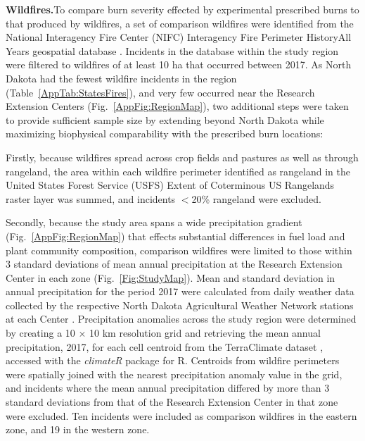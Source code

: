 \documentclass[fire,article,submit,oneauthor,pdftex]{Definitions/mdpi}
\begin{document}
\textbf{Wildfires.\textemdash}To compare burn severity effected by experimental prescribed burns to that produced by wildfires, a set of comparison wildfires were identified from the National Interagency Fire Center (NIFC) Interagency Fire Perimeter History\textemdash All Years geospatial database \cite{nifc2024}. 
Incidents in the database within the study region were filtered to wildfires of at least 10 ha that occurred between 2017. 
As North Dakota had the fewest wildfire incidents in the region (Table~\ref{AppTab:StatesFires}), and very few occurred near the Research Extension Centers (Fig.~\ref{AppFig:RegionMap}), two additional steps were taken to provide sufficient sample size by extending beyond North Dakota while maximizing biophysical comparability with the prescribed burn locations:
 
Firstly, because wildfires spread across crop fields and pastures as well as through rangeland, the area within each wildfire perimeter identified as rangeland in the United States Forest Service (USFS) Extent of Coterminous US Rangelands raster layer \cite{usdaforestservicenodate} was summed, and incidents $<$20\% rangeland were excluded. 

Secondly, because the study area spans a wide precipitation gradient (Fig.~\ref{AppFig:RegionMap}) that effects substantial differences in fuel load and plant community composition, comparison wildfires were limited to those within 3 standard deviations of mean annual precipitation at the Research Extension Center in each zone (Fig.~\ref{Fig:StudyMap}).
Mean and standard deviation in annual precipitation for the period 2017 were calculated from daily weather data collected by the respective North Dakota Agricultural Weather Network stations at each Center \cite{ndawn2025, ndawn2025a}. 
Precipitation anomalies across the study region were determined by creating a 10 $\times$ 10 km resolution grid and retrieving the mean annual precipitation, 2017, for each cell centroid from the TerraClimate dataset \cite{abatzoglou2018}, accessed with the \emph{climateR} package \cite{johnson2021} for \textsf{R}. 
Centroids from wildfire perimeters were spatially joined with the nearest precipitation anomaly value in the grid, and incidents where the mean annual precipitation differed  by more than 3 standard deviations from that of the Research Extension Center in that zone were excluded.
Ten incidents were included as comparison wildfires in the eastern zone, and 19 in the western zone. 
\end{document}
